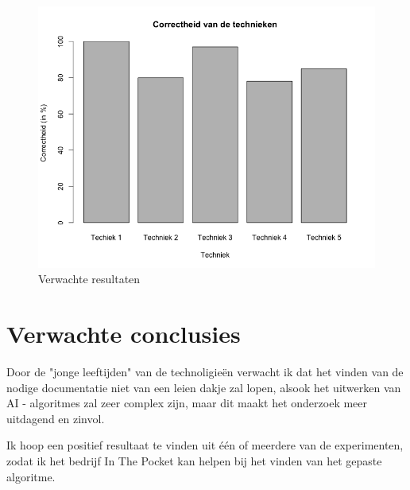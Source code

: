 \begin{figure}[H]
	\centering
	\includegraphics[scale=0.5]{Correctheid_technieken}
	\caption{Verwachte resultaten}
\end{figure}

\section{Verwachte conclusies}
\label{sec:verwachte_conclusies}
Door de "jonge leeftijden" van de technoligieën verwacht ik dat het vinden van de nodige documentatie niet van een leien dakje zal lopen, alsook het uitwerken van AI - algoritmes zal zeer complex zijn, maar dit maakt het onderzoek meer uitdagend en zinvol.

Ik hoop een positief resultaat te vinden uit één of meerdere van de experimenten, zodat ik het bedrijf In The Pocket kan helpen bij het vinden van het gepaste algoritme.
